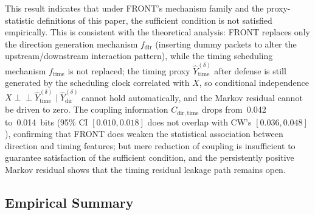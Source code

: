 \documentclass[lettersize,journal]{IEEEtran}
\begin{document}
This result indicates that under FRONT's mechanism family and the
proxy-statistic definitions of this paper, the sufficient condition is not
satisfied empirically.
This is consistent with the theoretical analysis: FRONT replaces only the
direction generation mechanism $f_{\mathrm{dir}}$ (inserting dummy packets
to alter the upstream/downstream interaction pattern), while the timing
scheduling mechanism $f_{\mathrm{time}}$ is not replaced;
the timing proxy $\hat{Y}^{(\delta)}_{\mathrm{time}}$ after defense is
still generated by the scheduling clock correlated with $X$, so conditional
independence $X\perp\!\!\!\perp \hat{Y}^{(\delta)}_{\mathrm{time}}\mid
\hat{Y}^{(\delta)}_{\mathrm{dir}}$ cannot hold automatically, and the
Markov residual cannot be driven to zero.
The coupling information $C_{\mathrm{dir,time}}$ drops from~0.042
to~0.014~bits (95\% CI $[0.010,0.018]$ does not overlap with CW's
$[0.036,0.048]$), confirming that FRONT does weaken the statistical
association between direction and timing features;
but mere reduction of coupling is insufficient to guarantee satisfaction
of the sufficient condition, and the persistently positive Markov residual
shows that the timing residual leakage path remains open.

\subsection{Empirical Summary}
\end{document}
